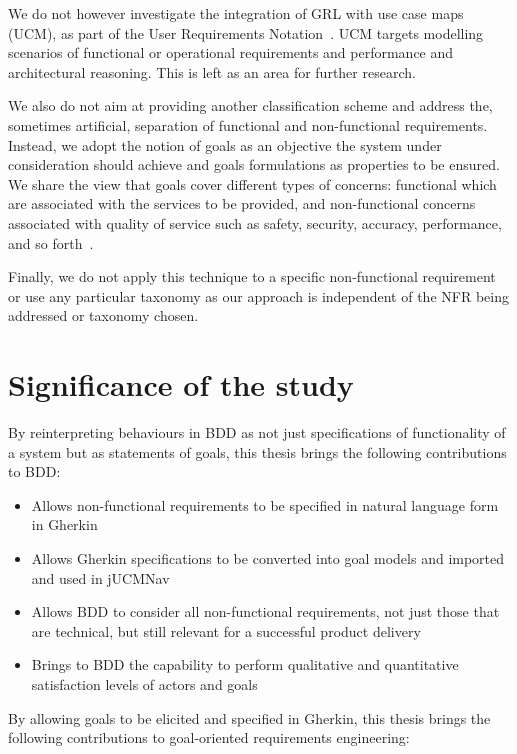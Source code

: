 \documentclass[dissertation]{softeng}
\begin{document}
We do not however investigate the integration of GRL with use case maps (UCM), as part of the User Requirements Notation~\citep{liu2004designing}. UCM targets modelling scenarios of functional or operational requirements and performance and architectural reasoning. This is left as an area for further research.

We also do not aim at providing another classification scheme and address the, sometimes artificial, separation of functional and non-functional requirements. Instead, we adopt the notion of goals as an objective the system under consideration should achieve and goals formulations as properties to be ensured. We share the view that goals cover different types of concerns: functional which are associated with the services to be provided, and non-functional concerns associated with quality of service such as safety, security, accuracy, performance, and so forth~\citep{Lamsweerde:2001wpba}.

Finally, we do not apply this technique to a specific non-functional requirement or use any particular taxonomy as our approach is independent of the NFR being addressed or taxonomy chosen.

\section{Significance of the study}

By reinterpreting behaviours in BDD as not just specifications of functionality of a system but as statements of goals, this thesis brings the following contributions to BDD:

\begin{center}
\begin{itemize}
\item Allows non-functional requirements to be specified in natural language form in Gherkin
\item Allows Gherkin specifications to be converted into goal models and imported and used in jUCMNav
\item Allows BDD to consider all non-functional requirements, not just those that are technical, but still relevant for a successful product delivery
\item Brings to BDD the capability to perform qualitative and quantitative satisfaction levels of actors and goals 
\end{itemize}
\end{center}

By allowing goals to be elicited and specified in Gherkin, this thesis brings the following contributions to goal-oriented requirements engineering:
\end{document}
